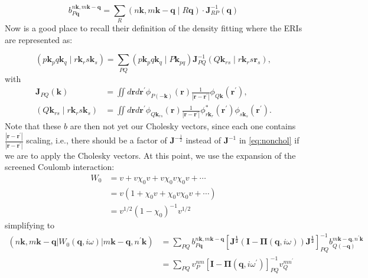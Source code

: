 \documentclass[12pt]{article}
\begin{document}
\begin{equation}
b_{P \mathbf{q}}^{n \mathbf{k}, m \mathbf{k}-\mathbf{q}}=\sum_{R}(n \mathbf{k}, m \mathbf{k}-\mathbf{q} \mid R \mathbf{q}) \cdot \mathbf{J}_{R P}^{-1}(\mathbf{q})
\label{eq:nonchol}
\end{equation}
Now is a good place to recall their definition of the density fitting where the ERIs are represented as:


\begin{equation*}
\left(p \mathbf{k}_{p} q \mathbf{k}_{q} \mid r \mathbf{k}_{r} s \mathbf{k}_{s}\right)=\sum_{P Q}\left(p \mathbf{k}_{p} q \mathbf{k}_{q} \mid P \mathbf{k}_{p q}\right) \mathbf{J}_{P Q}^{-1}\left(Q \mathbf{k}_{r s} \mid r \mathbf{k}_{r} s \mathbf{r}_{s}\right), \tag{11}
\end{equation*}
with
\begin{align*}
\mathbf{J}_{P Q}(\mathbf{k}) & =\iint d \mathbf{r} d \mathbf{r}^{\prime} \phi_{P(-\mathbf{k})}(\mathbf{r}) \frac{1}{\left|\mathbf{r}-\mathbf{r}^{\prime}\right|} \phi_{Q \mathbf{k}}\left(\mathbf{r}^{\prime}\right),  \tag{12}\\
\left(Q \mathbf{k}_{r s} \mid r \mathbf{k}_{r} s \mathbf{k}_{s}\right) & =\iint d \mathbf{r} d \mathbf{r}^{\prime} \phi_{Q \mathbf{k}_{r s}}(\mathbf{r}) \frac{1}{\left|\mathbf{r}-\mathbf{r}^{\prime}\right|} \phi_{r \mathbf{k}_{r}}^{*}\left(\mathbf{r}^{\prime}\right) \phi_{s \mathbf{k}_{s}}\left(\mathbf{r}^{\prime}\right) . \tag{13}
\end{align*}
Note that these $b$ are then not yet our Cholesky vectors, since each one contains $\frac{|\mathbf{r}-\mathbf{r}^{\prime}|}{|\mathbf{r}-\mathbf{r}^{\prime}|}$ scaling, i.e., there should be a factor of $\mathbf{J}^{-\frac{1}{2}}$  instead of $\mathbf{J}^{-1}$ in \ref{eq:nonchol} if we are to apply the Cholesky vectors.
At this point, we use the expansion of the screened Coulomb interaction:
\begin{align}
    W_0 &= v + v\chi_0 v + v\chi_0 v\chi_0 v + \cdots\\
    &= v(1 + \chi_0 v + \chi_0 v \chi_0 v + \cdots)\\
    &= v^{1/2} \left(1 - \chi_0\right)^{-1} v^{1/2}
\end{align}
simplifying to 
\begin{align}
    \left(n\mathbf{k}, m\mathbf{k}-\mathbf{q}\left|W_{0}(\mathbf{q}, i\omega )\right| m\mathbf{k}-\mathbf{q}, n^{\prime}\mathbf{k}\right) &= \sum_{PQ} b_{P\mathbf{q}}^{n\mathbf{k}, m\mathbf{k}-\mathbf{q}} \left[\mathbf{J^{\frac{1}{2}}}\left( \mathbf{I} - \boldsymbol{\Pi}(\mathbf{q}, i\omega ) \right) \mathbf{J^{\frac{1}{2}}}\right]^{-1}_{PQ} b_{Q(-\mathbf{q})}^{m\mathbf{k}-\mathbf{q}, n^{\prime}\mathbf{k}}\\
    &= \sum_{PQ} v_{P}^{n m}\left[\mathbf{I}-\mathbf{\Pi}\left(\mathbf{q}, i \omega^{\prime}\right)\right]_{P Q}^{-1} v_{Q}^{m n^{\prime}}
\end{align}
\end{document}
